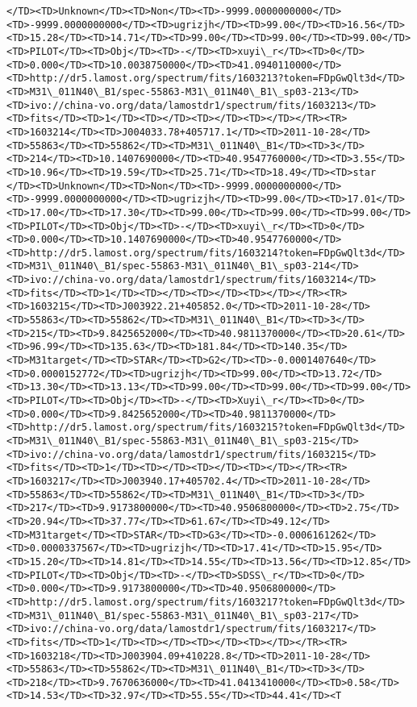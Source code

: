 \documentclass[11pt]{article}
\begin{document}
\begin{Verbatim}[commandchars=\\\{\}]
</TD><TD>Unknown</TD><TD>Non</TD><TD>-9999.0000000000</TD><TD>-9999.0000000000</TD><TD>ugrizjh</TD><TD>99.00</TD><TD>16.56</TD><TD>15.28</TD><TD>14.71</TD><TD>99.00</TD><TD>99.00</TD><TD>99.00</TD><TD>PILOT</TD><TD>Obj</TD><TD>-</TD><TD>xuyi\_r</TD><TD>0</TD><TD>0.000</TD><TD>10.0038750000</TD><TD>41.0940110000</TD><TD>http://dr5.lamost.org/spectrum/fits/1603213?token=FDpGwQlt3d</TD><TD>M31\_011N40\_B1/spec-55863-M31\_011N40\_B1\_sp03-213</TD><TD>ivo://china-vo.org/data/lamostdr1/spectrum/fits/1603213</TD><TD>fits</TD><TD>1</TD><TD></TD><TD></TD><TD></TD></TR><TR><TD>1603214</TD><TD>J004033.78+405717.1</TD><TD>2011-10-28</TD><TD>55863</TD><TD>55862</TD><TD>M31\_011N40\_B1</TD><TD>3</TD><TD>214</TD><TD>10.1407690000</TD><TD>40.9547760000</TD><TD>3.55</TD><TD>10.96</TD><TD>19.59</TD><TD>25.71</TD><TD>18.49</TD><TD>star     </TD><TD>Unknown</TD><TD>Non</TD><TD>-9999.0000000000</TD><TD>-9999.0000000000</TD><TD>ugrizjh</TD><TD>99.00</TD><TD>17.01</TD><TD>17.00</TD><TD>17.30</TD><TD>99.00</TD><TD>99.00</TD><TD>99.00</TD><TD>PILOT</TD><TD>Obj</TD><TD>-</TD><TD>xuyi\_r</TD><TD>0</TD><TD>0.000</TD><TD>10.1407690000</TD><TD>40.9547760000</TD><TD>http://dr5.lamost.org/spectrum/fits/1603214?token=FDpGwQlt3d</TD><TD>M31\_011N40\_B1/spec-55863-M31\_011N40\_B1\_sp03-214</TD><TD>ivo://china-vo.org/data/lamostdr1/spectrum/fits/1603214</TD><TD>fits</TD><TD>1</TD><TD></TD><TD></TD><TD></TD></TR><TR><TD>1603215</TD><TD>J003922.21+405852.0</TD><TD>2011-10-28</TD><TD>55863</TD><TD>55862</TD><TD>M31\_011N40\_B1</TD><TD>3</TD><TD>215</TD><TD>9.8425652000</TD><TD>40.9811370000</TD><TD>20.61</TD><TD>96.99</TD><TD>135.63</TD><TD>181.84</TD><TD>140.35</TD><TD>M31target</TD><TD>STAR</TD><TD>G2</TD><TD>-0.0001407640</TD><TD>0.0000152772</TD><TD>ugrizjh</TD><TD>99.00</TD><TD>13.72</TD><TD>13.30</TD><TD>13.13</TD><TD>99.00</TD><TD>99.00</TD><TD>99.00</TD><TD>PILOT</TD><TD>Obj</TD><TD>-</TD><TD>Xuyi\_r</TD><TD>0</TD><TD>0.000</TD><TD>9.8425652000</TD><TD>40.9811370000</TD><TD>http://dr5.lamost.org/spectrum/fits/1603215?token=FDpGwQlt3d</TD><TD>M31\_011N40\_B1/spec-55863-M31\_011N40\_B1\_sp03-215</TD><TD>ivo://china-vo.org/data/lamostdr1/spectrum/fits/1603215</TD><TD>fits</TD><TD>1</TD><TD></TD><TD></TD><TD></TD></TR><TR><TD>1603217</TD><TD>J003940.17+405702.4</TD><TD>2011-10-28</TD><TD>55863</TD><TD>55862</TD><TD>M31\_011N40\_B1</TD><TD>3</TD><TD>217</TD><TD>9.9173800000</TD><TD>40.9506800000</TD><TD>2.75</TD><TD>20.94</TD><TD>37.77</TD><TD>61.67</TD><TD>49.12</TD><TD>M31target</TD><TD>STAR</TD><TD>G3</TD><TD>-0.0006161262</TD><TD>0.0000337567</TD><TD>ugrizjh</TD><TD>17.41</TD><TD>15.95</TD><TD>15.20</TD><TD>14.81</TD><TD>14.55</TD><TD>13.56</TD><TD>12.85</TD><TD>PILOT</TD><TD>Obj</TD><TD>-</TD><TD>SDSS\_r</TD><TD>0</TD><TD>0.000</TD><TD>9.9173800000</TD><TD>40.9506800000</TD><TD>http://dr5.lamost.org/spectrum/fits/1603217?token=FDpGwQlt3d</TD><TD>M31\_011N40\_B1/spec-55863-M31\_011N40\_B1\_sp03-217</TD><TD>ivo://china-vo.org/data/lamostdr1/spectrum/fits/1603217</TD><TD>fits</TD><TD>1</TD><TD></TD><TD></TD><TD></TD></TR><TR><TD>1603218</TD><TD>J003904.09+410228.8</TD><TD>2011-10-28</TD><TD>55863</TD><TD>55862</TD><TD>M31\_011N40\_B1</TD><TD>3</TD><TD>218</TD><TD>9.7670636000</TD><TD>41.0413410000</TD><TD>0.58</TD><TD>14.53</TD><TD>32.97</TD><TD>55.55</TD><TD>44.41</TD><T
\end{Verbatim}
\end{document}
